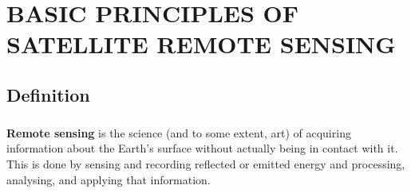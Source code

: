 \chapter{\normalsize{BASIC PRINCIPLES OF SATELLITE REMOTE SENSING}}
\section{Definition}
\paragraph{}
\textbf{Remote sensing} is the science (and to some extent, art) of acquiring information about the Earth's surface without actually being in contact with it. This is done by sensing and recording reflected or emitted energy and processing, analysing, and applying that information.
